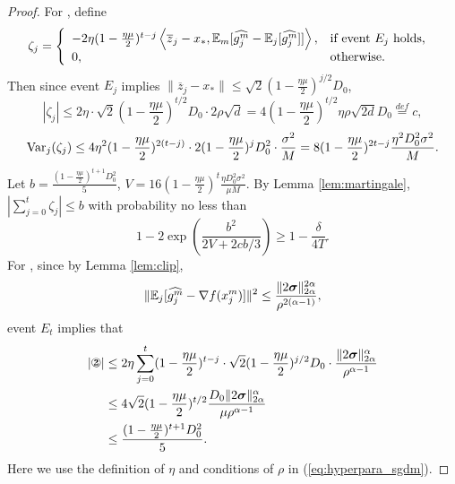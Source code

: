 \documentclass{article} %
\numberwithin{equation}{section}
\newcommand{\cirone}{\text{\ding{172}}}
\newcommand{\cirtwo}{\text{\ding{173}}}
\renewcommand{\eqref}[1]{(\ref{#1})}
\begin{document}
\begin{proof}
    For \cirone, define
    \begin{equation}
        \zeta_j=\left\{
            \begin{array}{ll}
                -2\eta(1-\frac{\eta\mu}{2})^{t-j}\left\langle\overline{z}_j-x_*, \mathbb{E}_m [\widehat{g_j^m}-\mathbb{E}_j[\widehat{g_j^m}]]\right\rangle, & \text{if event $E_j$ holds, } \\
                0 ,& \text{otherwise.}
            \end{array}
        \right.
    \end{equation}
    Then since event $E_j$ implies $\|\overline{z}_j-x_*\|\leq \sqrt{2}(1-\frac{\eta\mu}{2})^{j/2}D_0$,
    \begin{equation}
        |\zeta_j|\leq 2\eta\cdot \sqrt{2}(1-\frac{\eta\mu}{2})^{t/2}D_0 \cdot 2\rho\sqrt{d}=4(1-\frac{\eta\mu}{2})^{t/2}\eta\rho\sqrt{2d}D_0\overset{def}{=}c,
    \end{equation}
    \begin{equation}
        \mathrm{Var}_j(\zeta_j) \leq 4\eta^2(1-\frac{\eta\mu}{2})^{2(t-j)}\cdot 2(1-\frac{\eta\mu}{2})^j D_0^2\cdot \frac{\sigma^2}{M}=8(1-\frac{\eta\mu}{2})^{2t-j}\frac{\eta^2D_0^2\sigma^2}{M}.
    \end{equation}
    Let $b=\frac{(1-\frac{\eta\mu}{2})^{t+1}D_0^2}{5}$, $V=16(1-\frac{\eta\mu}{2})^t\frac{\eta D_0^2\sigma^2}{\mu M}$.
    By Lemma \ref{lem:martingale}, $|\sum_{j=0}^t\zeta_j|\leq b$ with probability no less than
    \begin{equation}
        1-2\exp\left(\frac{b^2}{2V+2cb/3}\right)\geq 1-\frac{\delta}{4T}.
    \end{equation}
    For \cirtwo, since by Lemma \ref{lem:clip},
    \begin{equation}
        \|\mathbb{E}_j[\widehat{g_j^m}-\nabla f(x_j^m)]\|^2\leq \frac{\|2\boldsymbol{\sigma}\|_{2\alpha}^{2\alpha}}{\rho^{2(\alpha-1)}},
    \end{equation}
    event $E_t$ implies that
    \begin{equation}
        \begin{aligned}
            |\cirtwo|
            &\leq 2\eta \sum_{j=0}^t(1-\frac{\eta\mu}{2})^{t-j}\cdot \sqrt{2}(1-\frac{\eta\mu}{2})^{j/2}D_0 \cdot\frac{\|2\boldsymbol{\sigma}\|_{2\alpha}^{\alpha}}{\rho^{\alpha-1}} \\
            &\leq 4\sqrt{2}(1-\frac{\eta\mu}{2})^{t/2}\frac{D_0\|2\boldsymbol{\sigma}\|_{2\alpha}^{\alpha}}{\mu\rho^{\alpha-1}} \\
            &\leq \frac{(1-\frac{\eta\mu}{2})^{t+1}D_0^2}{5}.
        \end{aligned}
    \end{equation}
    Here we use the definition of $\eta$ and conditions of $\rho$ in \eqref{eq:hyperpara_sgdm}.
    

\end{proof}
\end{document}
